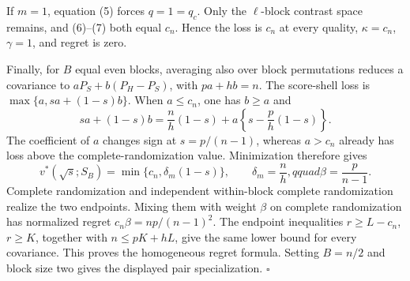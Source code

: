 If \(m=1\), equation (5) forces \(q=1=q_c\).  Only the \(\ell\)-block contrast space remains, and (6)--(7) both equal \(c_n\).  Hence the loss is \(c_n\) at every quality, \(\kappa=c_n\), \(\gamma=1\), and regret is zero.

Finally, for \(B\) equal even blocks, averaging also over block permutations reduces a covariance to \(aP_S+b(P_H-P_S)\), with \(pa+hb=n\).  The score-shell loss is \(\max\{a,sa+(1-s)b\}\).  When \(a\leq c_n\), one has \(b\geq a\) and
\[
sa+(1-s)b
=\frac{n}{h}(1-s)+a\left\{s-\frac{p}{h}(1-s)\right\}.
\]
The coefficient of \(a\) changes sign at \(s=p/(n-1)\), whereas \(a>c_n\) already has loss above the complete-randomization value.  Minimization therefore gives
\[
v^*(\sqrt{s};S_B)=\min\{c_n,\delta_m(1-s)\},
\qquad \delta_m=\frac{n}{h},qquad \beta=\frac{p}{n-1}.
\tag{16}
\]
Complete randomization and independent within-block complete randomization realize the two endpoints.  Mixing them with weight \(\beta\) on complete randomization has normalized regret \(c_n\beta=np/(n-1)^2\).  The endpoint inequalities \(r\geq L-c_n\), \(r\geq K\), together with \(n\leq pK+hL\), give the same lower bound for every covariance.  This proves the homogeneous regret formula.  Setting \(B=n/2\) and block size two gives the displayed pair specialization. \(\square\)